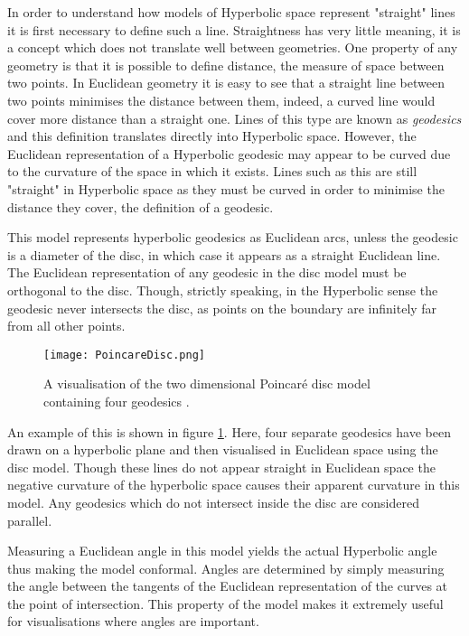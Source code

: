 In order to understand how models of Hyperbolic space represent "straight" lines it is first necessary to define such a line. Straightness has very little meaning, it is a concept which does not translate well between geometries. One property of any geometry is that it is possible to define distance, the measure of space between two points. In Euclidean geometry it is easy to see that a straight line between two points minimises the distance between them, indeed, a curved line would cover more distance than a straight one. Lines of this type are known as \textit{geodesics} and this definition translates directly into Hyperbolic space. However, the Euclidean representation of a Hyperbolic geodesic may appear to be curved due to the curvature of the space in which it exists. Lines such as this are still "straight" in Hyperbolic space as they must be curved in order to minimise the distance they cover, the definition of a geodesic.

This model represents hyperbolic geodesics as Euclidean arcs, unless the geodesic is a diameter of the disc, in which case it appears as a straight Euclidean line. The Euclidean representation of any geodesic in the disc model must be orthogonal to the disc. Though, strictly speaking, in the Hyperbolic sense the geodesic never intersects the disc, as points on the boundary are infinitely far from all other points.

\begin{figure}
	\centering
	\texttt{[image: PoincareDisc.png]}
	\caption[A visualisation of the two dimensional Poincar\'{e} disc model containing four geodesics]{A visualisation of the two dimensional Poincar\'{e} disc model containing four geodesics .}
	\label{fig:poincare_example}
\end{figure}

An example of this is shown in figure \ref{fig:poincare_example}. Here, four separate geodesics have been drawn on a hyperbolic plane and then visualised in Euclidean space using the disc model. Though these lines do not appear straight in Euclidean space the negative curvature of the hyperbolic space causes their apparent curvature in this model. Any geodesics which do not intersect inside the disc are considered parallel.

Measuring a Euclidean angle in this model yields the actual Hyperbolic angle thus making the model conformal. Angles are determined by simply measuring the angle between the tangents of the Euclidean representation of the curves at the point of intersection. This property of the model makes it extremely useful for visualisations where angles are important.

